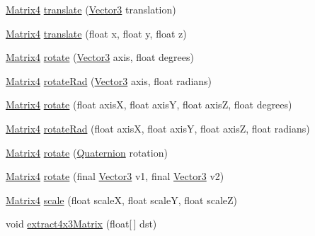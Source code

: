 \begin{DoxyCompactItemize}
\hyperlink{classairhockeyjava_1_1util_1_1_matrix4}{Matrix4} \hyperlink{classairhockeyjava_1_1util_1_1_matrix4_a779d9d88d273335438177184e9102455}{translate} (\hyperlink{classairhockeyjava_1_1util_1_1_vector3}{Vector3} translation)
\item 
\hyperlink{classairhockeyjava_1_1util_1_1_matrix4}{Matrix4} \hyperlink{classairhockeyjava_1_1util_1_1_matrix4_a55ed95185c7cb916dc4c795938434e23}{translate} (float x, float y, float z)
\item 
\hyperlink{classairhockeyjava_1_1util_1_1_matrix4}{Matrix4} \hyperlink{classairhockeyjava_1_1util_1_1_matrix4_a2044f334ab79b846ef1c57f68d2a3f36}{rotate} (\hyperlink{classairhockeyjava_1_1util_1_1_vector3}{Vector3} axis, float degrees)
\item 
\hyperlink{classairhockeyjava_1_1util_1_1_matrix4}{Matrix4} \hyperlink{classairhockeyjava_1_1util_1_1_matrix4_abd39901019dbae237d288fad729138a6}{rotate\+Rad} (\hyperlink{classairhockeyjava_1_1util_1_1_vector3}{Vector3} axis, float radians)
\item 
\hyperlink{classairhockeyjava_1_1util_1_1_matrix4}{Matrix4} \hyperlink{classairhockeyjava_1_1util_1_1_matrix4_a87dbec88893c001240a484d26f458cfa}{rotate} (float axis\+X, float axis\+Y, float axis\+Z, float degrees)
\item 
\hyperlink{classairhockeyjava_1_1util_1_1_matrix4}{Matrix4} \hyperlink{classairhockeyjava_1_1util_1_1_matrix4_a3ab587560a87a5402b45374ec09fad41}{rotate\+Rad} (float axis\+X, float axis\+Y, float axis\+Z, float radians)
\item 
\hyperlink{classairhockeyjava_1_1util_1_1_matrix4}{Matrix4} \hyperlink{classairhockeyjava_1_1util_1_1_matrix4_a00b8249564ac2cfaa6b934bc4fbdee96}{rotate} (\hyperlink{classairhockeyjava_1_1util_1_1_quaternion}{Quaternion} rotation)
\item 
\hyperlink{classairhockeyjava_1_1util_1_1_matrix4}{Matrix4} \hyperlink{classairhockeyjava_1_1util_1_1_matrix4_ab9072faaf7ef4a5205e30caedbe72b0d}{rotate} (final \hyperlink{classairhockeyjava_1_1util_1_1_vector3}{Vector3} v1, final \hyperlink{classairhockeyjava_1_1util_1_1_vector3}{Vector3} v2)
\item 
\hyperlink{classairhockeyjava_1_1util_1_1_matrix4}{Matrix4} \hyperlink{classairhockeyjava_1_1util_1_1_matrix4_a6c40d2aa19b65cdc8749121b126a6940}{scale} (float scale\+X, float scale\+Y, float scale\+Z)
\item 
void \hyperlink{classairhockeyjava_1_1util_1_1_matrix4_a36193bcdb80e11a62346ae8b5b563b12}{extract4x3\+Matrix} (float\mbox{[}$\,$\mbox{]} dst)
\end{DoxyCompactItemize}
